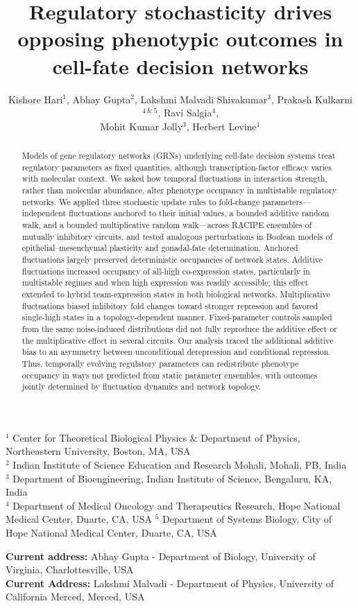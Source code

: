 \documentclass[11pt]{article}
\title{Regulatory stochasticity drives opposing phenotypic outcomes in cell-fate decision networks}
\author{Kishore Hari$^1$, Abhay Gupta$^2$, Lakshmi Malvadi Shivakumar$^3$, Prakash Kulkarni$^{4~\&~5}$, Ravi Salgia$^4$, \\ Mohit Kumar Jolly$^3$, Herbert Levine$^1$}
\begin{document}
\maketitle
\begin{center}
    $^1$ Center for Theoretical Biological Physics \& Department of Physics, Northeastern University, Boston, MA, USA\\
    $^2$ Indian Institute of Science Education and Research Mohali, Mohali, PB, India\\
    $^3$ Department of Bioengineering, Indian Institute of Science, Bengaluru, KA, India \\
    $^4$ Department of Medical Oncology and Therapeutics Research, Hope National Medical Center, Duarte, CA, USA
    $^5$ Department of Systems Biology, City of Hope National Medical Center, Duarte, CA, USA 
\end{center}
\begin{center}
    \small \textbf{Current address:} Abhay Gupta - Department of Biology, University of Virginia, Charlottesville, USA\\
    \small \textbf{Current Address:} Lakshmi Malvadi - Department of Physics, University of California Merced, Merced, USA\\
\end{center}
\begin{abstract}
Models of gene regulatory networks (GRNs) underlying cell-fate decision systems treat regulatory parameters as fixed quantities, although transcription-factor efficacy varies with molecular context. We asked how temporal fluctuations in interaction strength, rather than molecular abundance, alter phenotype occupancy in multistable regulatory networks. We applied three stochastic update rules to fold-change parameters—independent fluctuations anchored to their initial values, a bounded additive random walk, and a bounded multiplicative random walk—across RACIPE ensembles of mutually inhibitory circuits, and tested analogous perturbations in Boolean models of epithelial–mesenchymal plasticity and gonadal-fate determination. Anchored fluctuations largely preserved deterministic occupancies of network states. Additive fluctuations increased occupancy of all-high co-expression states, particularly in multistable regimes and when high expression was readily accessible; this effect extended to hybrid team-expression states in both biological networks. Multiplicative fluctuations biased inhibitory fold changes toward stronger repression and favored single-high states in a topology-dependent manner. Fixed-parameter controls sampled from the same noise-induced distributions did not fully reproduce the additive effect or the multiplicative effect in several circuits. Our analysis traced the additional additive bias to an asymmetry between unconditional derepression and conditional repression. Thus, temporally evolving regulatory parameters can redistribute phenotype occupancy in ways not predicted from static parameter ensembles, with outcomes jointly determined by fluctuation dynamics and network topology.
\end{abstract}
\end{document}

